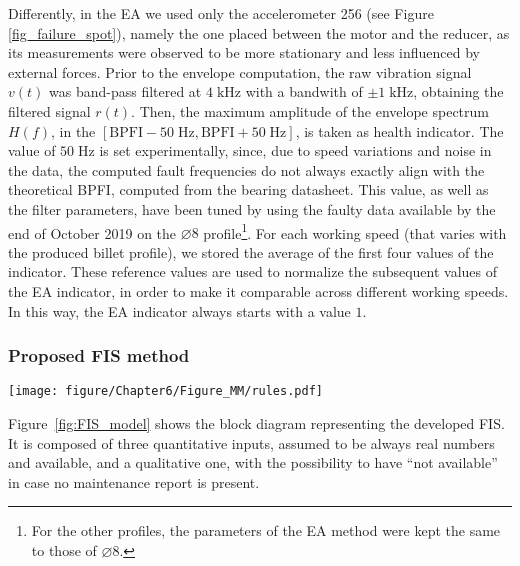 Differently, in the EA we used only the accelerometer 256 (see Figure \ref{fig_failure_spot}), namely the one placed between the motor and the reducer, as its measurements were observed to  be more stationary and less influenced by external forces.
Prior to the envelope computation, the raw vibration signal $v(t)$ was band-pass filtered at $4\;\text{kHz}$ with a bandwith of $\pm 1\;\text{kHz}$, obtaining the filtered signal $r(t)$. Then, the maximum amplitude of the envelope spectrum $H(f)$, in the $\left[ \text{BPFI}-50\;\text{Hz}, \text{BPFI}+50\;\text{Hz} \right]$, is taken as health indicator. The value of $50\;\text{Hz}$ is set experimentally, since, due to speed variations and noise in the data, the computed fault frequencies do not always exactly align with the theoretical BPFI, computed from the bearing datasheet. This value, as well as the filter parameters, have been tuned by using the faulty data available by the end of October 2019 on the $\diameter 8$ profile\footnote{For the other profiles, the parameters of the EA method were kept the same to those of $\diameter 8$.}.
{For each working speed (that varies with the produced billet profile), we stored the average of the first four values of the indicator. These reference values are used to normalize the subsequent values of the EA indicator, in order to make it comparable across different working speeds.}
In this way, the EA indicator always starts with a value $1$.



\subsubsection{Proposed FIS method}

\begin{figure*}[!ht]
    \centering
    \texttt{[image: figure/Chapter6/Figure\_MM/rules.pdf]}
    \caption{Proposed FIS model for diagnosis with membership functions of inputs and output.}
    \label{fig:FIS_model}
\end{figure*}


Figure~\ref{fig:FIS_model} shows the block diagram representing the developed FIS. It is composed of three quantitative inputs, assumed to be always real numbers and available, and a qualitative one, with the possibility to have ``not available'' in case no maintenance report is present.

